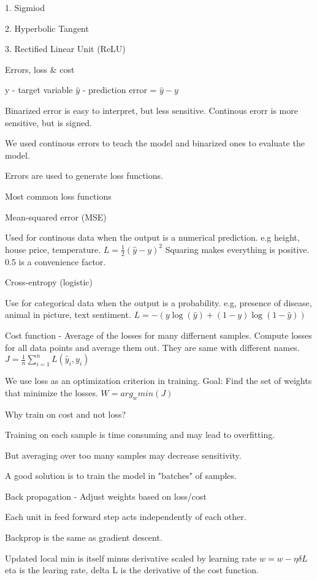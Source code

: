 \documentclass[30pt, a4]{article}
\begin{document}
1. Sigmiod 

2. Hyperbolic Tangent

3. Rectified Linear Unit (ReLU)

Errors, loss \& cost

y - target variable
$\hat y$ - prediction
error = $\hat y - y$

Binarized error is easy to interpret, but less sensitive.
Continous erorr is more sensitive, but is signed.

We used continous errors to teach the model and binarized ones to evaluate the
model.

Errors are used to generate loss functions.

Most common loss functions

Mean-squared error (MSE)

Used for continous data when the output is a numerical prediction. e.g height,
house price, temperature.
{
\Large
$L = \frac{1}{2}(\hat y - y)^2$
}
Squaring makes everything is positive. 0.5 is a convenience factor.

Cross-entropy (logistic)

Use for categorical data when the output is a probability. e.g, presence of 
disease, animal in picture, text sentiment.
{
\Large
$L = -(y\log(\hat y)+(1-y)\log(1-\hat y))$
}

Cost function - Average of the losses for many differnent samples. Compute
losses for all data points and average them out. They are same with different
names.
{
\Large
$J = \frac{1}{n}\sum \limits_{i=1}^n L(\hat y_i, y_i)$
}

We use loss as an optimization criterion in training. Goal: Find the set of 
weights that minimize the losses. $W = arg_w min(J)$

Why train on cost and not loss?

Training on each sample is time consuming and may lead to overfitting.

But averaging over too many samples may decrease sensitivity.

A good solution is to train the model in "batches" of samples.

Back propagation - Adjust weights based on loss/cost

Each unit in feed forward step acts independently of each other.

Backprop is the same as gradient descent.

Updated local min is itself minus derivative scaled by learning rate
{
\Large
$w = w - \eta \delta L$
}
eta is the learing rate, delta L is the derivative of the cost function.
\end{document}
